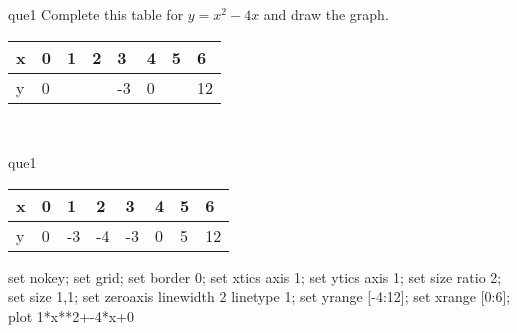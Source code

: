 \documentclass[13.5pt, varwidth=true]{beamer}
\begin{document}
\begin{frame}[shrink=19,fragile]
	\begin{beamercolorbox}[rounded=true, left, shadow=true,wd=14.8cm]{que1}
		 Complete this table for $y = x^{2} - 4x$ and draw the graph. \\[0.3cm] \renewcommand{\arraystretch}{1.2}\begin{tabular}{|C|C|C|C|C|C|C|C|} \hline x & 0 & 1 & 2 & 3 & 4 & 5 & 6 \\ \hline y & 0 &  &  & -3 & 0 &  & 12\\ \hline \end{tabular}\\[0.3cm]
	\end{beamercolorbox}
\end{frame}
\begin{frame}[shrink=19,fragile]
	\begin{beamercolorbox}[rounded=true, left, shadow=true,wd=14.8cm]{que1}
		\renewcommand{\arraystretch}{1.2}\begin{tabular}{|C|C|C|C|C|C|C|C|} \hline x & 0 & 1 & 2 & 3 & 4 & 5 & 6 \\ \hline y & 0 & -3 & -4 & -3 & 0 & 5 & 12\\ \hline \end{tabular}\begin{gnuplot}[terminal=pdf] set nokey; set grid; set border 0; set xtics axis 1; set ytics axis 1; set size ratio 2; set size 1,1; set zeroaxis linewidth 2 linetype 1; set yrange [-4:12]; set xrange [0:6]; plot 1*x**2+-4*x+0 \end{gnuplot}
	\end{beamercolorbox}
\end{frame}
\end{document}
